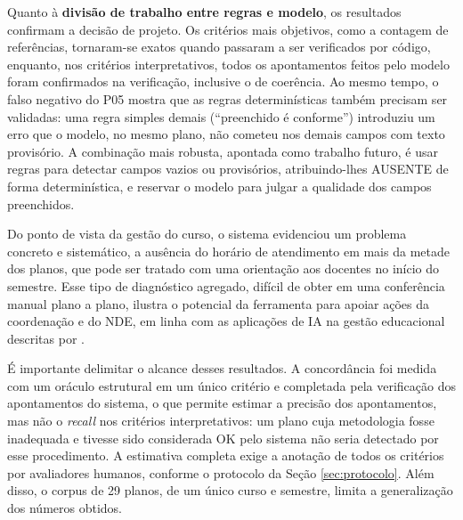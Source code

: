 Quanto à \textbf{divisão de trabalho entre regras e modelo}, os resultados confirmam a decisão de projeto. Os critérios mais objetivos, como a contagem de referências, tornaram-se exatos quando passaram a ser verificados por código, enquanto, nos critérios interpretativos, todos os apontamentos feitos pelo modelo foram confirmados na verificação, inclusive o de coerência. Ao mesmo tempo, o falso negativo do P05 mostra que as regras determinísticas também precisam ser validadas: uma regra simples demais (``preenchido é conforme'') introduziu um erro que o modelo, no mesmo plano, não cometeu nos demais campos com texto provisório. A combinação mais robusta, apontada como trabalho futuro, é usar regras para detectar campos vazios ou provisórios, atribuindo-lhes AUSENTE de forma determinística, e reservar o modelo para julgar a qualidade dos campos preenchidos.

Do ponto de vista da gestão do curso, o sistema evidenciou um problema concreto e sistemático, a ausência do horário de atendimento em mais da metade dos planos, que pode ser tratado com uma orientação aos docentes no início do semestre. Esse tipo de diagnóstico agregado, difícil de obter em uma conferência manual plano a plano, ilustra o potencial da ferramenta para apoiar ações da coordenação e do NDE, em linha com as aplicações de IA na gestão educacional descritas por .

É importante delimitar o alcance desses resultados. A concordância foi medida com um oráculo estrutural em um único critério e completada pela verificação dos apontamentos do sistema, o que permite estimar a precisão dos apontamentos, mas não o \textit{recall} nos critérios interpretativos: um plano cuja metodologia fosse inadequada e tivesse sido considerada OK pelo sistema não seria detectado por esse procedimento. A estimativa completa exige a anotação de todos os critérios por avaliadores humanos, conforme o protocolo da Seção \ref{sec:protocolo}. Além disso, o corpus de 29 planos, de um único curso e semestre, limita a generalização dos números obtidos.
